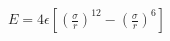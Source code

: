 \documentclass[12pt]{article}
\begin{document}
  \thispagestyle{empty}

\begin{eqnarray*}
  E = 4\epsilon \left[ \left(\frac{\sigma}{r}\right)^{12}-\left(\frac{\sigma}{r}\right)^{6} \right]
\end{eqnarray*}
\end{document}
